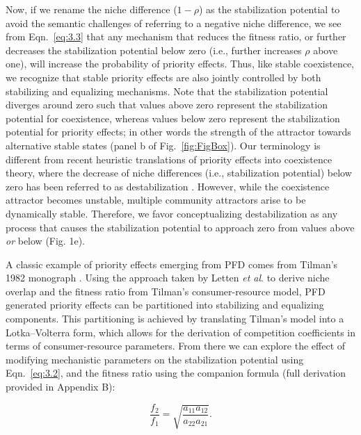 \noindent Now, if we rename the niche difference ($1-\rho$) as the stabilization potential to avoid the semantic challenges of referring to a negative niche difference, we see from Eqn.~\ref{eq:3.3} that any mechanism that reduces the fitness ratio, or further decreases the stabilization potential below zero (i.e., further increases $\rho$ above one), will increase the probability of priority effects. Thus, like stable coexistence, we recognize that stable priority effects are also jointly controlled by both stabilizing and equalizing mechanisms. Note that the stabilization potential diverges around zero such that values above zero represent the stabilization potential for coexistence, whereas values below zero represent the stabilization potential for priority effects; in other words the strength of the attractor towards alternative stable states (panel b of Fig.~\ref{fig:FigBox}). Our terminology is different from recent heuristic translations of priority effects into coexistence theory, where the decrease of niche differences (i.e., stabilization potential) below zero has been referred to as destabilization \citep{Mordecai2011, Fukami2016}. However, while the coexistence attractor becomes unstable, multiple community attractors arise to be dynamically stable. Therefore, we favor conceptualizing destabilization as any process that causes the stabilization potential to approach zero from values above \textit{or} below (Fig. 1e). 
\par
 
 
A classic example of priority effects emerging from PFD comes from Tilman's 1982 monograph \cite{tilman1982}. Using the approach taken by Letten \textit{et al}.\cite{Letten2017} to derive niche overlap and the fitness ratio from Tilman's consumer-resource model, PFD generated priority effects can be partitioned into stabilizing and equalizing components. This partitioning is achieved by translating Tilman's model into a Lotka--Volterra form, which allows for the derivation of competition coefficients in terms of consumer-resource parameters. From there we can explore the effect of modifying mechanistic parameters on the stabilization potential using Eqn.~\ref{eq:3.2}, and the fitness ratio using the companion formula \citep{Chesson2008b, Chesson2013ecosys} (full derivation provided in Appendix B):

\begin{equation}
\frac{f_{2}}{f_{1}}=\sqrt {\frac{{{a_{11}}{a_{12}}}}{{{a_{22}}{a_{21}}}}}.
\tag{3.4}\label{eq:3.4}
\end{equation}

